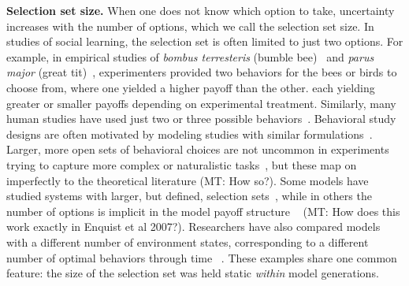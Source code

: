 \documentclass[letterpaper,11.5pt]{scrartcl}
\newcommand{\mt}[1]{{\textcolor{myorange} {({\tiny MT:} #1)}}}
\newcommand{\cm}[1]{{\textcolor{mypurple} {({\tiny CM:} #1)}}}
\begin{document}
\textbf{Selection set size.}
When one does not know which option to take, uncertainty increases with the number of options, which we call the selection set size.
In studies of social learning, the selection set is often limited
to just two options.  For example, in empirical studies of \emph{bombus
terresteris} (bumble bee)~\cite{Baracchi2018} and \emph{parus major} (great
tit)~\cite{Aplin2017}, experimenters provided two behaviors for the bees or birds
to choose from, where one yielded a higher payoff than the other. %
each yielding greater or smaller payoffs depending on experimental treatment.
Similarly, many human studies have used just two or three possible
behaviors~\cite{McElreath2005,Toyokawa2019}. Behavioral study designs are
often motivated by modeling studies with similar formulations~\cite{Rogers1988,boyd1995does,
perreault2012bayesian}.
Larger, more open sets of behavioral
choices are not uncommon in experiments trying to capture more complex or
naturalistic tasks~\cite{derex2013, wasielewski2014}, but these map on
imperfectly to the theoretical literature \mt{How so?}. Some models have studied systems with
larger, but defined, selection sets~\cite{Rendell2010}, while in others the
number of options is implicit in the model payoff structure
~\cite{Enquist2007} \mt{How does this work exactly in Enquist et al 2007?}. 
Researchers have also compared models with a different number
of environment states, corresponding to a different number of optimal behaviors
through time ~\cite{Feldman1996}. These examples share one common feature: 
the size of the selection set was held static \emph{within} model generations.
\end{document}
